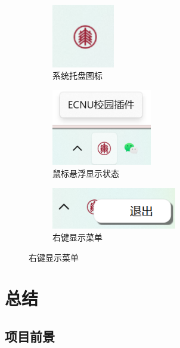 \documentclass[14pt,a4paper,UTF8,twoside]{article}
\begin{document}
\begin{figure}[H]
    \centering
    \begin{subfigure}[H]{0.3\textwidth}
        \centering
        \includegraphics[width=0.3\textwidth]{img/tray_icon}
        \caption{系统托盘图标}
        \label{fig:tray-icon}
    \end{subfigure}
    \begin{subfigure}[H]{0.3\textwidth}
        \centering
        \includegraphics[width=0.48\textwidth]{img/tray_icon_hover}
        \caption{鼠标悬浮显示状态}
        \label{fig:tray-icon-hover}
    \end{subfigure}
    \begin{subfigure}[H]{0.3\textwidth}
        \centering
        \includegraphics[width=0.6\textwidth]{img/tray_icon_menu}
        \caption{右键显示菜单}
        \label{fig:tray-icon-menu}
    \end{subfigure}
\end{figure}

\section{总结}

\subsection{项目前景}
\end{document}
